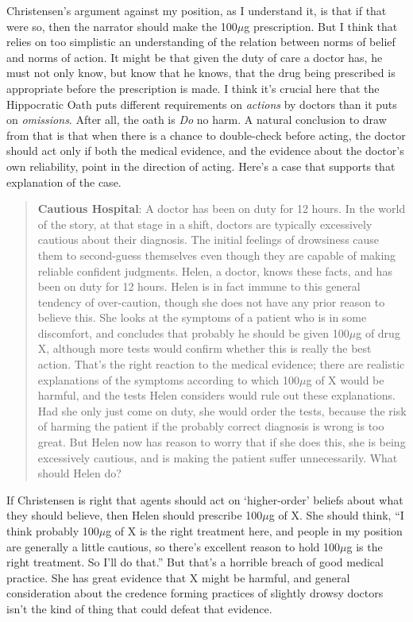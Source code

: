 \documentclass[
  11pt,
  letterpaper,
  DIV=11,
  numbers=noendperiod,
  twoside]{scrartcl}
\begin{document}
Christensen's argument against my position, as I understand it, is that
if that were so, then the narrator should make the 100\(\mu\)g
prescription. But I think that relies on too simplistic an understanding
of the relation between norms of belief and norms of action. It might be
that given the duty of care a doctor has, he must not only know, but
know that he knows, that the drug being prescribed is appropriate before
the prescription is made. I think it's crucial here that the Hippocratic
Oath puts different requirements on \emph{actions} by doctors than it
puts on \emph{omissions}. After all, the oath is \emph{Do} no harm. A
natural conclusion to draw from that is that when there is a chance to
double-check before acting, the doctor should act only if both the
medical evidence, and the evidence about the doctor's own reliability,
point in the direction of acting. Here's a case that supports that
explanation of the case.

\begin{quote}
\textbf{Cautious Hospital}: A doctor has been on duty for 12 hours. In
the world of the story, at that stage in a shift, doctors are typically
excessively cautious about their diagnosis. The initial feelings of
drowsiness cause them to second-guess themselves even though they are
capable of making reliable confident judgments. Helen, a doctor, knows
these facts, and has been on duty for 12 hours. Helen is in fact immune
to this general tendency of over-caution, though she does not have any
prior reason to believe this. She looks at the symptoms of a patient who
is in some discomfort, and concludes that probably he should be given
100\(\mu\)g of drug X, although more tests would confirm whether this is
really the best action. That's the right reaction to the medical
evidence; there are realistic explanations of the symptoms according to
which 100\(\mu\)g of X would be harmful, and the tests Helen considers
would rule out these explanations. Had she only just come on duty, she
would order the tests, because the risk of harming the patient if the
probably correct diagnosis is wrong is too great. But Helen now has
reason to worry that if she does this, she is being excessively
cautious, and is making the patient suffer unnecessarily. What should
Helen do?
\end{quote}

If Christensen is right that agents should act on `higher-order' beliefs
about what they should believe, then Helen should prescribe 100\(\mu\)g
of X. She should think, ``I think probably 100\(\mu\)g of X is the right
treatment here, and people in my position are generally a little
cautious, so there's excellent reason to hold 100\(\mu\)g is the right
treatment. So I'll do that.'' But that's a horrible breach of good
medical practice. She has great evidence that X might be harmful, and
general consideration about the credence forming practices of slightly
drowsy doctors isn't the kind of thing that could defeat that evidence.
\end{document}
